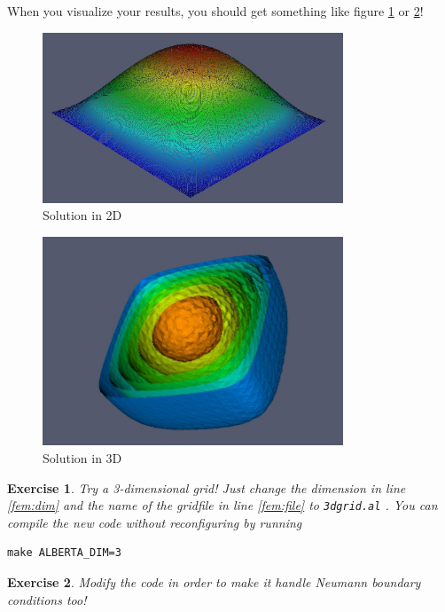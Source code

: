 \documentclass[11pt,a4paper,headinclude,footinclude,DIV16,headings=normal]{scrreprt}
\newtheorem{exc}{Exercise}[chapter]
\begin{document}
When you visualize your results, you should get something like figure \ref{Fig:FEM1} or \ref{Fig:FEM2}!

\begin{figure}
\centering
\includegraphics[width=0.8\textwidth]{EPS/fem2d}
\caption{Solution in 2D}
\label{Fig:FEM1}
\end{figure}

\begin{figure}
\centering
\includegraphics[width=0.8\textwidth]{EPS/fem3d}
\caption{Solution in 3D}
\label{Fig:FEM2}
\end{figure}

\begin{exc}
 Try a 3-dimensional grid! Just change the dimension in line \ref{fem:dim} and the name of the gridfile in line \ref{fem:file} to \lstinline!3dgrid.al! . You can compile the new code without reconfiguring by running
\begin{lstlisting}
make ALBERTA_DIM=3
\end{lstlisting}
\end{exc}

\begin{exc}
 Modify the code in order to make it handle Neumann boundary conditions too!
\end{exc}
\end{document}
